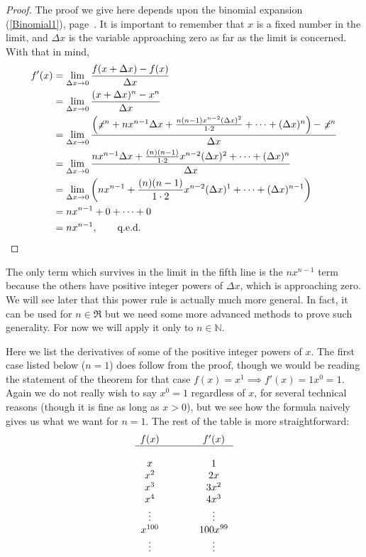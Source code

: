 \begin{proof} The proof we give here depends upon the 
binomial expansion (\ref{Binomial1}), page~\pageref{Binomial1}.  
It is important to remember
that $x$ is a fixed number in the limit, and $\Delta x$ is
the variable approaching zero as far as the limit is concerned.
With that in mind,
\begin{align*}
f'(x)&=\lim_{\Delta x\to0}\frac{f(x+\Delta x)-f(x)}{\Delta x}\\
&= \lim_{\Delta x\to0}\frac{(x+\Delta x)^n-x^n}{\Delta x}\\
&=\lim_{\Delta x\to0}\frac{\left(\not{\!x^n}+nx^{n-1}\Delta x
+\frac{n(n-1)x^{n-2}(\Delta x)^2}{1\cdot 2}
+\cdots+(\Delta x)^n\right)-\not{\!x^n}}{\Delta x}\\
&=\lim_{\Delta x\to0}\frac{nx^{n-1}\Delta x+\frac{(n)(n-1)}{1\cdot 2}
x^{n-2}(\Delta x)^2
+\cdots+(\Delta x)^n}{\Delta x}\\
&=\lim_{\Delta x\to0}
\left(
\vphantom{\frac12}
nx^{n-1}+\frac{(n)(n-1)}{1\cdot 2}x^{n-2}(\Delta x)^1+\cdots+(\Delta x)^{n-1}\right)\\
&=nx^{n-1}+0+\cdots+0\\
&=nx^{n-1}, \qquad\text{q.e.d.}\end{align*}
\end{proof}
The only term which survives in the limit
in the fifth line is the $nx^{n-1}$ term
because the others have positive integer powers of $\Delta x$,
which is approaching zero.
We will see later that this power rule is actually much more
general.  In fact, it can be used for $n\in\Re$ but we need
some more advanced methods to prove such generality.
For now we will apply it only to $n\in\mathbb{N}$.

\bex Here we list the derivatives of some of the positive
integer powers of $x$.  The first case listed below ($n=1$) does 
follow from the proof, though we would be reading
the statement of the theorem for that case 
$f(x)=x^1\implies f'(x)=1x^0=1$.  Again we do not
really wish to say $x^0=1$ regardless of $x$,
for several technical reasons (though it is fine
as long as $x>0$), but we see how the formula
naively gives us what we want for $n=1$.  The
rest of the table is more straightforward:
$$\begin{array}{ccc}
f(x)&\qquad&f'(x)\vphantom{\ds{\frac11}}\\
\hline\\
x&&1\\ \vphantom{\ds{\frac12}}
x^2&&2x\\ \vphantom{\ds{\frac12}}
x^3&&3x^2\\ \vphantom{\ds{\frac12}}
x^4&&4x^3\\ \vphantom{\ds{\frac12}}
\vdots&&\vdots\\ \vphantom{\ds{\frac12}}
x^{100}&&100x^{99}\\ \vphantom{\ds{\frac12}}
\vdots&&\vdots 
\end{array}$$
\eex

